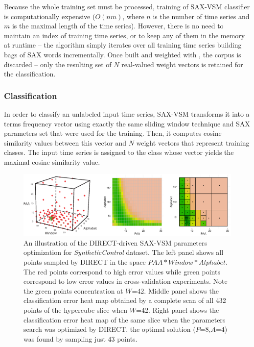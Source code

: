 Because the whole training set must be processed, training of SAX-VSM classifier is computationally 
expensive ($O(nm)$, where $n$ is the number of time series and $m$ is the maximal length of the time series). 
However, there is no need to maintain an index of training time series, or to keep any 
of them in the memory at runtime -- the algorithm simply iterates over all training time series building 
bags of SAX words incrementally. Once built and weighted with \tfidf, the corpus is discarded -- only the
resulting set of $N$ real-valued weight vectors is retained for the classification.

\subsubsection{Classification}
In order to classify an unlabeled input time series, SAX-VSM transforms it into a terms frequency vector using 
exactly the same sliding window technique and SAX parameters set that were used for the training. 
Then, it computes cosine similarity values between this vector and $N$ \tfidf weight vectors that represent 
training classes. The input time series is assigned to the class whose vector yields the maximal cosine 
similarity value.

\begin{figure}[t]
   \centering
   \includegraphics[width=150mm]{figures/figure_direct.eps}
   \caption[An illustration of the DIRECT-driven SAX-VSM parameters optimization for \textit{SyntheticControl} dataset.]
   {An illustration of the DIRECT-driven SAX-VSM parameters optimization for \textit{SyntheticControl} dataset. 
   The left panel shows all points sampled by DIRECT in the space \mbox{$PAA*Window*Alphabet$}.
   The red points correspond to high error values while green points correspond to low error values 
   in cross-validation experiments. 
   Note the green points concentration at $W$=42. 
   Middle panel shows the classification error heat map obtained by a complete scan 
   of all 432 points of the hypercube slice when $W$=42. 
   Right panel shows the classification error heat map of the same slice when 
   the parameters search was optimized by DIRECT, 
   the optimal solution ($P$=8,$A$=4) was found by sampling just 43 points.}
   \label{fig:direct-sampling}
\end{figure}

